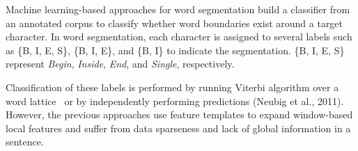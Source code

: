 \documentclass[11pt,letterpaper]{article}
\begin{document}
Machine learning-based approaches for word segmentation build a classifier from an annotated corpus to classify whether word boundaries exist around a target character. 
In word segmentation, each character is assigned to several labels such as \{B, I, E, S\}, \{B, I, E\}, and \{B, I\} to indicate the segmentation. \{B, I, E, S\} represent {\it Begin}, {\it Inside}, {\it End}, and {\it Single}, respectively. 



Classification of these labels is performed by running Viterbi algorithm over a word lattice~\cite{kudo-yamamoto-matsumoto:2004:EMNLP,nakagawa2004chinese,kaji-kitsuregawa:2013:IJCNLP} or by independently performing predictions (Neubig et al., 2011). However, the previous approaches use feature templates to expand window-based local features and suffer from data sparseness and lack of global information in a sentence. 
\end{document}
